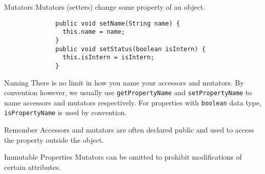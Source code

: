\documentclass[10pt, compress]{beamer}
\begin{document}
\begin{slide}
	\begin{block}{Mutators}
		Mutators (setters) change some property of an object.
		\begin{verbatim}
			  public void setName(String name) {
			    this.name = name;
			  }
			  public void setStatus(boolean isIntern) {
			    this.isIntern = isIntern;
			  }
		\end{verbatim}
	\end{block}
\end{slide}

\begin{slide}
	\begin{block}{Naming}
		There is no limit in how you name your accessors and mutators.
		By convention however, we usually use \texttt{getPropertyName} and \texttt{setPropertyName} to name accessors and mutators respectively.
		For properties with \texttt{boolean} data type, \texttt{isPropertyName} is used by convention.
	\end{block}
\end{slide}

\begin{slide}
	\begin{block}{Remember}
		Accessors and mutators are often declared public and used to access the property outside the object.
	\end{block}
	\begin{block}{Immutable Properties}
		Mutators can be omitted to prohibit modifications of certain attributes.
	\end{block}
\end{slide}

\end{document}
